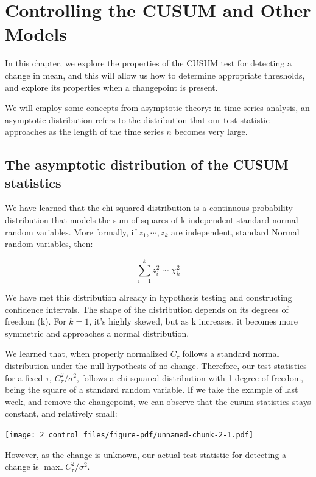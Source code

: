 \documentclass[
  letterpaper,
  DIV=11,
  numbers=noendperiod]{scrreprt}
\begin{document}

\chapter{Controlling the CUSUM and Other
Models}\label{controlling-the-cusum-and-other-models}

In this chapter, we explore the properties of the CUSUM test for
detecting a change in mean, and this will allow us how to determine
appropriate thresholds, and explore its properties when a changepoint is
present.

We will employ some concepts from asymptotic theory: in time series
analysis, an asymptotic distribution refers to the distribution that our
test statistic approaches as the length of the time series \(n\) becomes
very large.

\section{The asymptotic distribution of the CUSUM
statistics}\label{the-asymptotic-distribution-of-the-cusum-statistics}

We have learned that the chi-squared distribution is a continuous
probability distribution that models the sum of squares of k independent
standard normal random variables. More formally, if \(z_1, \cdots, z_k\)
are independent, standard Normal random variables, then:

\[
\sum_{i=1}^k z^2_i \sim \chi^2_k
\]

We have met this distribution already in hypothesis testing and
constructing confidence intervals. The shape of the distribution depends
on its degrees of freedom (k). For \(k=1\), it's highly skewed, but as k
increases, it becomes more symmetric and approaches a normal
distribution.

We learned that, when properly normalized \(C_\tau\) follows a standard
normal distribution under the null hypothesis of no change. Therefore,
our test statistics for a fixed \(\tau\), \(C_\tau^2/\sigma^2\), follows
a chi-squared distribution with 1 degree of freedom, being the square of
a standard random variable. If we take the example of last week, and
remove the changepoint, we can observe that the cusum statistics stays
constant, and relatively small:

\texttt{[image: 2\_control\_files/figure-pdf/unnamed-chunk-2-1.pdf]}

However, as the change is unknown, our actual test statistic for
detecting a change is \(\max_\tau C_\tau^2/σ^2\).
\end{document}
